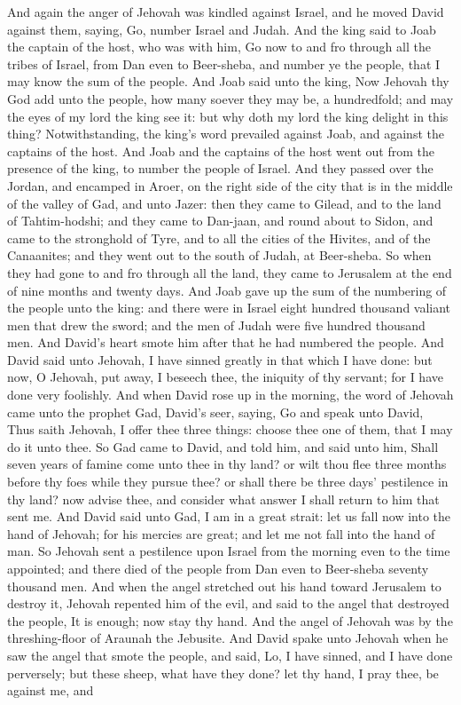 And again the anger of Jehovah was kindled against Israel, and he moved David against them, saying, Go, number Israel and Judah. And the king said to Joab the captain of the host, who was with him, Go now to and fro through all the tribes of Israel, from Dan even to Beer-sheba, and number ye the people, that I may know the sum of the people. And Joab said unto the king, Now Jehovah thy God add unto the people, how many soever they may be, a hundredfold; and may the eyes of my lord the king see it: but why doth my lord the king delight in this thing? Notwithstanding, the king’s word prevailed against Joab, and against the captains of the host. And Joab and the captains of the host went out from the presence of the king, to number the people of Israel. And they passed over the Jordan, and encamped in Aroer, on the right side of the city that is in the middle of the valley of Gad, and unto Jazer: then they came to Gilead, and to the land of Tahtim-hodshi; and they came to Dan-jaan, and round about to Sidon, and came to the stronghold of Tyre, and to all the cities of the Hivites, and of the Canaanites; and they went out to the south of Judah, at Beer-sheba. So when they had gone to and fro through all the land, they came to Jerusalem at the end of nine months and twenty days. And Joab gave up the sum of the numbering of the people unto the king: and there were in Israel eight hundred thousand valiant men that drew the sword; and the men of Judah were five hundred thousand men.  And David’s heart smote him after that he had numbered the people. And David said unto Jehovah, I have sinned greatly in that which I have done: but now, O Jehovah, put away, I beseech thee, the iniquity of thy servant; for I have done very foolishly. And when David rose up in the morning, the word of Jehovah came unto the prophet Gad, David’s seer, saying, Go and speak unto David, Thus saith Jehovah, I offer thee three things: choose thee one of them, that I may do it unto thee. So Gad came to David, and told him, and said unto him, Shall seven years of famine come unto thee in thy land? or wilt thou flee three months before thy foes while they pursue thee? or shall there be three days’ pestilence in thy land? now advise thee, and consider what answer I shall return to him that sent me. And David said unto Gad, I am in a great strait: let us fall now into the hand of Jehovah; for his mercies are great; and let me not fall into the hand of man.  So Jehovah sent a pestilence upon Israel from the morning even to the time appointed; and there died of the people from Dan even to Beer-sheba seventy thousand men. And when the angel stretched out his hand toward Jerusalem to destroy it, Jehovah repented him of the evil, and said to the angel that destroyed the people, It is enough; now stay thy hand. And the angel of Jehovah was by the threshing-floor of Araunah the Jebusite. And David spake unto Jehovah when he saw the angel that smote the people, and said, Lo, I have sinned, and I have done perversely; but these sheep, what have they done? let thy hand, I pray thee, be against me, and 